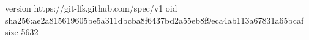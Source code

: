 version https://git-lfs.github.com/spec/v1
oid sha256:ae2a815619605be5a311dbcba8f6437bd2a55eb8f9eca4ab113a67831a65bcaf
size 5632
